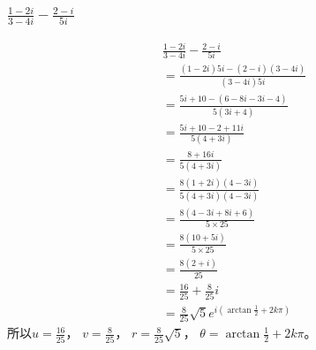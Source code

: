 \documentclass[10pt,a4paper,twocolumn]{ctexart}
\numberwithin{equation}{subsection}
\begin{document}
\subsubsection{$\frac{1-2 i}{3-4 i}-\frac{2-i}{5 i}$}
\begin{align}
		& \frac{1-2 i}{3-4 i}-\frac{2-i}{5 i} \\
		& =\frac{(1-2 i) 5 i-(2-i)(3-4 i)}{(3-4 i) 5 i} \\
		& =\frac{5 i+10-(6-8 i-3 i-4)}{5(3 i+4)} \\
		& =\frac{5 i+10-2+11 i}{5(4+3 i)} \\
		& =\frac{8+16 i}{5(4+3 i)} \\
		& =\frac{8(1+2 i)(4-3 i)}{5(4+3 i)(4-3 i)} \\
		& =\frac{8(4-3 i+8 i+6)}{5 \times 25} \\
		& =\frac{8(10+5 i)}{5 \times 25} \\
		& =\frac{8(2+i)}{25} \\
		& =\frac{16}{25}+\frac{8}{25} i \\
		& = \frac{8}{25}\sqrt{5} e^{i(\arctan \frac{1}{2} + 2k\pi)}
	\end{align}
所以$u=\frac{16}{25}$， $v=\frac{8}{25}$， $r=\frac{8}{25}\sqrt{5}$， $\theta = \arctan \frac{1}{2} + 2k\pi$。

\end{document}
